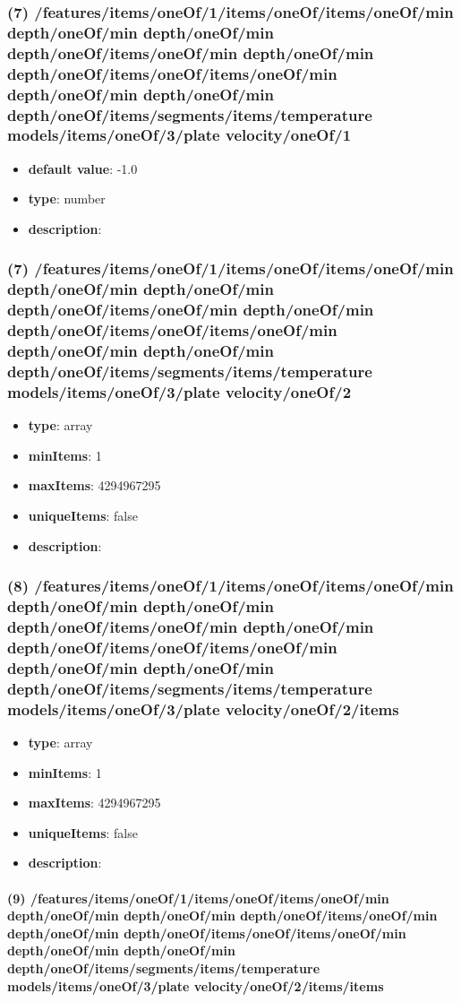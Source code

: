 \subsubsection{(7) /features/items/oneOf/1/items/oneOf/items/oneOf/min depth/oneOf/min depth/oneOf/min depth/oneOf/items/oneOf/min depth/oneOf/min depth/oneOf/items/oneOf/items/oneOf/min depth/oneOf/min depth/oneOf/min depth/oneOf/items/segments/items/temperature models/items/oneOf/3/plate velocity/oneOf/1}
\begin{itemize}[leftmargin=7em]\item {\bf default value}: -1.0
\item {\bf type}: number
\item {\bf description}: 
\end{itemize}\subsubsection{(7) /features/items/oneOf/1/items/oneOf/items/oneOf/min depth/oneOf/min depth/oneOf/min depth/oneOf/items/oneOf/min depth/oneOf/min depth/oneOf/items/oneOf/items/oneOf/min depth/oneOf/min depth/oneOf/min depth/oneOf/items/segments/items/temperature models/items/oneOf/3/plate velocity/oneOf/2}
\begin{itemize}[leftmargin=7em]\item {\bf type}: array
\item {\bf minItems}: 1
\item {\bf maxItems}: 4294967295
\item {\bf uniqueItems}: false
\item {\bf description}: 
\end{itemize}\subsubsection{(8) /features/items/oneOf/1/items/oneOf/items/oneOf/min depth/oneOf/min depth/oneOf/min depth/oneOf/items/oneOf/min depth/oneOf/min depth/oneOf/items/oneOf/items/oneOf/min depth/oneOf/min depth/oneOf/min depth/oneOf/items/segments/items/temperature models/items/oneOf/3/plate velocity/oneOf/2/items}
\begin{itemize}[leftmargin=8em]\item {\bf type}: array
\item {\bf minItems}: 1
\item {\bf maxItems}: 4294967295
\item {\bf uniqueItems}: false
\item {\bf description}: 
\end{itemize}\paragraph{(9) /features/items/oneOf/1/items/oneOf/items/oneOf/min depth/oneOf/min depth/oneOf/min depth/oneOf/items/oneOf/min depth/oneOf/min depth/oneOf/items/oneOf/items/oneOf/min depth/oneOf/min depth/oneOf/min depth/oneOf/items/segments/items/temperature models/items/oneOf/3/plate velocity/oneOf/2/items/items}
